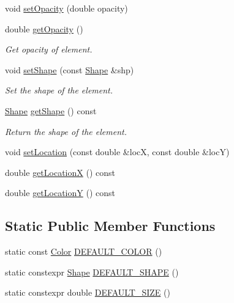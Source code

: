 \begin{DoxyCompactItemize}
void \mbox{\hyperlink{classbridges_1_1datastructure_1_1_element_visualizer_a03f0ba203affb77d4ba8d2f1a6b1eea0}{set\+Opacity}} (double opacity)
\item 
double \mbox{\hyperlink{classbridges_1_1datastructure_1_1_element_visualizer_af403e841efd1dab3669fdda2fd927f99}{get\+Opacity}} ()
\begin{DoxyCompactList}\small\item\em Get opacity of element. \end{DoxyCompactList}\item 
void \mbox{\hyperlink{classbridges_1_1datastructure_1_1_element_visualizer_a316cccfc1e75ccbfdfe6d68da824b8b3}{set\+Shape}} (const \mbox{\hyperlink{namespacebridges_1_1datastructure_a3408f5f44d9c6062e5f3adb7e1bbb7f0}{Shape}} \&shp)
\begin{DoxyCompactList}\small\item\em Set the shape of the element. \end{DoxyCompactList}\item 
\mbox{\hyperlink{namespacebridges_1_1datastructure_a3408f5f44d9c6062e5f3adb7e1bbb7f0}{Shape}} \mbox{\hyperlink{classbridges_1_1datastructure_1_1_element_visualizer_a3b1dd1d61f43844142adce1f0bd03dcf}{get\+Shape}} () const
\begin{DoxyCompactList}\small\item\em Return the shape of the element. \end{DoxyCompactList}\item 
void \mbox{\hyperlink{classbridges_1_1datastructure_1_1_element_visualizer_ae980cb185ddb11ecd1cebeb4834734bf}{set\+Location}} (const double \&locX, const double \&locY)
\item 
double \mbox{\hyperlink{classbridges_1_1datastructure_1_1_element_visualizer_a8ee6ac3a3b03194d51cfbc08a1360b5d}{get\+LocationX}} () const
\item 
double \mbox{\hyperlink{classbridges_1_1datastructure_1_1_element_visualizer_a6012c9545e56e6210b6a6485873a5c92}{get\+LocationY}} () const
\end{DoxyCompactItemize}
\subsection*{Static Public Member Functions}
\begin{DoxyCompactItemize}
\item 
static const \mbox{\hyperlink{classbridges_1_1datastructure_1_1_color}{Color}} \mbox{\hyperlink{classbridges_1_1datastructure_1_1_element_visualizer_a777a0295e8216e403108a6c90ce6790b}{D\+E\+F\+A\+U\+L\+T\+\_\+\+C\+O\+L\+OR}} ()
\item 
static constexpr \mbox{\hyperlink{namespacebridges_1_1datastructure_a3408f5f44d9c6062e5f3adb7e1bbb7f0}{Shape}} \mbox{\hyperlink{classbridges_1_1datastructure_1_1_element_visualizer_adfba1c4d4f04ff92545d932bfce5b9d1}{D\+E\+F\+A\+U\+L\+T\+\_\+\+S\+H\+A\+PE}} ()
\item 
static constexpr double \mbox{\hyperlink{classbridges_1_1datastructure_1_1_element_visualizer_afa0fa3f844171f311c3d9c9025a826c5}{D\+E\+F\+A\+U\+L\+T\+\_\+\+S\+I\+ZE}} ()
\end{DoxyCompactItemize}


